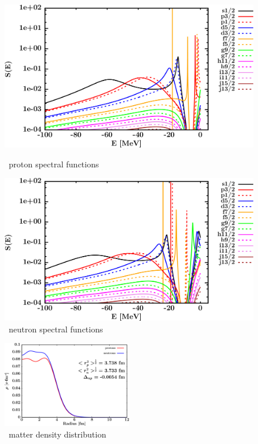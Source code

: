 \begin{figure}[H]
    \centering
    \begin{minipage}{0.45\textwidth}
        \centering
        \includegraphics[width=1.0\textwidth]{figures/ni58_protonSpectralFunctions.png}
        \caption{\niEight\ proton spectral functions}
        \label{DOMFitData_ni58_proton_spectralFunctions}
    \end{minipage}\hfill
    \begin{minipage}{0.45\textwidth}
        \centering
        \includegraphics[width=1.0\textwidth]{figures/ni58_neutronSpectralFunctions.png}
        \caption{\niEight\ neutron spectral functions}
        \label{DOMFitData_ni58_neutron_spectralFunctions}
    \end{minipage}
\end{figure}

\begin{figure}[H]
    \centering
    \includegraphics[width = 0.5\textwidth]{figures/ni58_matterDensity.png}
    \caption{\niEight\ matter density distribution}
    \label{DOMFitData_ni58_matterDensity}
\end{figure}

